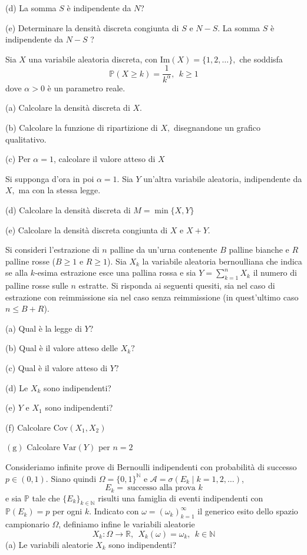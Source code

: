 (d) La somma $S$ è indipendente da $N$?

(e) Determinare la densità discreta congiunta di $S$ e $N-S$. La somma $S$ è indipendente da $N-S$ ?
\Esercizio{}

Sia $X$ una variabile aleatoria discreta, con $\mathrm{Im} (X)=\{1,2,\dots \},$ che soddisfa
\begin{equation*}
\mathbb{P} (X\geq k)=\frac{1}{k^{\alpha }} ,\ \ k\geq 1
\end{equation*}
dove $\alpha  >0$ è un parametro reale.

(a) Calcolare la densità discreta di $X$.

(b) Calcolare la funzione di ripartizione di $X,$ disegnandone un grafico qualitativo.

(c) Per $\alpha =1$, calcolare il valore atteso di $X$

Si supponga d'ora in poi $\alpha =1.$ Sia $Y$ un'altra variabile aleatoria, indipendente da $X,$ ma con la stessa legge.

(d) Calcolare la densità discreta di $M=\min \{X,Y\}$

(e) Calcolare la densità discreta congiunta di $X$ e $X+Y$.
\Esercizio{}

Si consideri l'estrazione di $n$ palline da un'urna contenente $B$ palline bianche e $R$ palline rosse ($B\geq 1$ e $R\geq 1$). Sia $X_{k}$ la variabile aleatoria bernoulliana che indica se alla $k$-esima estrazione esce una pallina rossa e sia $Y=\sum _{k=1}^{n} X_{k}$ il numero di palline rosse sulle $n$ estratte. Si risponda ai seguenti quesiti, sia nel caso di estrazione con reimmissione sia nel caso senza reimmissione (in quest'ultimo caso $n\leq B+R$).

(a) Qual è la legge di $Y$?

(b) Qual è il valore atteso delle $X_{k} ?$

(c) Qual è il valore atteso di $Y?$

(d) Le $X_{k}$ sono indipendenti?

(e) $Y$ e $X_{1}$ sono indipendenti?

(f) Calcolare $\mathrm{Cov}( X_{1} ,X_{2})$

$(\mathrm{g} )$ Calcolare $\mathrm{Var} (Y)$ per $n=2$
\Esercizio{}

Consideriamo infinite prove di Bernoulli indipendenti con probabilità di successo $p\in (0,1)$. Siano quindi $\Omega =\{0,1\}^{\mathbb{N}}$ e $\mathcal{A} =\sigma ( E_{k} \mid k=1,2,\dots )$,
\begin{equation*}
E_{k} =\ \text{successo alla prova } k
\end{equation*}
e sia $\mathbb{P}$ tale che $\{E_{k}\}_{k\in \mathbb{N}}$ risulti una famiglia di eventi indipendenti con $\mathbb{P}( E_{k}) =p$ per ogni $k$. Indicato con $\omega =( \omega _{k})_{k=1}^{\infty }$ il generico esito dello spazio campionario $\Omega $, definiamo infine le variabili aleatorie
\begin{equation*}
X_{k} :\Omega \rightarrow \mathbb{R} ,\ \ X_{k} (\omega )=\omega _{k} ,\ \ k\in \mathbb{N}
\end{equation*}
(a) Le variabili aleatorie $X_{k}$ sono indipendenti?

